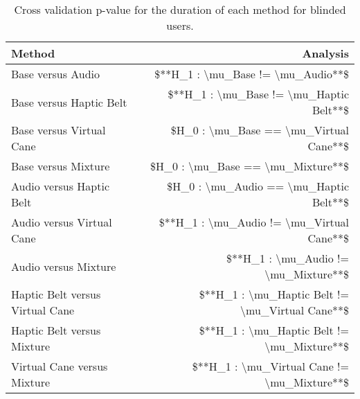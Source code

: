 
\begin{table}[!htb]
\centering
\caption{Cross validation p-value for the duration of each method for blinded users.}
\label{tab:lsd_duration}
\begin{tabular}{lr}
\toprule
                         Method &                                        Analysis \\
\midrule
              Base versus Audio &               \$**H\_1 : \textbackslash mu\_Base != \textbackslash mu\_Audio**\$ \\
        Base versus Haptic Belt &         \$**H\_1 : \textbackslash mu\_Base != \textbackslash mu\_Haptic Belt**\$ \\
       Base versus Virtual Cane &          \$H\_0 : \textbackslash mu\_Base == \textbackslash mu\_Virtual Cane**\$ \\
            Base versus Mixture &               \$H\_0 : \textbackslash mu\_Base == \textbackslash mu\_Mixture**\$ \\
       Audio versus Haptic Belt &          \$H\_0 : \textbackslash mu\_Audio == \textbackslash mu\_Haptic Belt**\$ \\
      Audio versus Virtual Cane &       \$**H\_1 : \textbackslash mu\_Audio != \textbackslash mu\_Virtual Cane**\$ \\
           Audio versus Mixture &            \$**H\_1 : \textbackslash mu\_Audio != \textbackslash mu\_Mixture**\$ \\
Haptic Belt versus Virtual Cane & \$**H\_1 : \textbackslash mu\_Haptic Belt != \textbackslash mu\_Virtual Cane**\$ \\
     Haptic Belt versus Mixture &      \$**H\_1 : \textbackslash mu\_Haptic Belt != \textbackslash mu\_Mixture**\$ \\
    Virtual Cane versus Mixture &     \$**H\_1 : \textbackslash mu\_Virtual Cane != \textbackslash mu\_Mixture**\$ \\
\bottomrule
\end{tabular}
\end{table}

